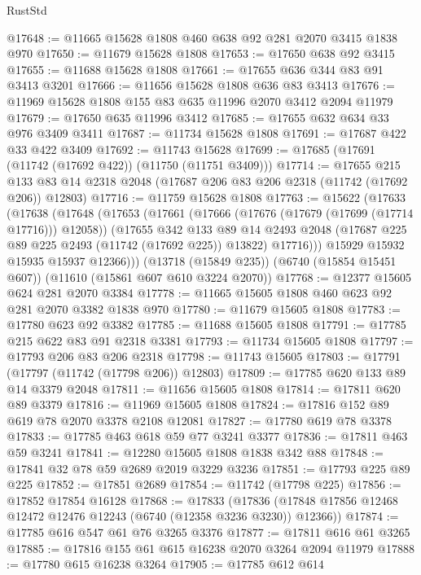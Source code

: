 \begin{lexlean}{RustStd}
\begin{coremodule}
@17648 := @11665 @15628 @1808 @460 @638 @92 @281 @2070 @3415 @1838 @970
@17650 := @11679 @15628 @1808
@17653 := @17650 @638 @92 @3415
@17655 := @11688 @15628 @1808
@17661 := @17655 @636 @344 @83 @91 @3413 @3201
@17666 := @11656 @15628 @1808 @636 @83 @3413
@17676 := @11969 @15628 @1808 @155 @83 @635 @11996 @2070 @3412 @2094 @11979
@17679 := @17650 @635 @11996 @3412
@17685 := @17655 @632 @634 @33 @976 @3409 @3411
@17687 := @11734 @15628 @1808
@17691 := @17687 @422 @33 @422 @3409
@17692 := @11743 @15628
@17699 := @17685 (@17691 (@11742 (@17692 @422)) (@11750 (@11751 @3409)))
@17714 := @17655
    @215
    @133
    @83
    @14
    @2318
    @2048
    (@17687 @206 @83 @206 @2318 (@11742 (@17692 @206)) @12803)
@17716 := @11759 @15628 @1808
@17763 := @15622
    (@17633
      (@17638
        (@17648
          (@17653
            (@17661
              (@17666 (@17676 (@17679 (@17699 (@17714 @17716))) @12058))
              (@17655
                @342
                @133
                @89
                @14
                @2493
                @2048
                (@17687 @225 @89 @225 @2493 (@11742 (@17692 @225)) @13822)
                @17716)))
          @15929
          @15932
          @15935
          @15937
          @12366)))
    (@13718 (@15849 @235))
    (@6740 (@15854 @15451 @607))
    (@11610 (@15861 @607 @610 @3224 @2070))
@17768 := @12377 @15605 @624 @281 @2070 @3384
@17778 := @11665 @15605 @1808 @460 @623 @92 @281 @2070 @3382 @1838 @970
@17780 := @11679 @15605 @1808
@17783 := @17780 @623 @92 @3382
@17785 := @11688 @15605 @1808
@17791 := @17785 @215 @622 @83 @91 @2318 @3381
@17793 := @11734 @15605 @1808
@17797 := @17793 @206 @83 @206 @2318
@17798 := @11743 @15605
@17803 := @17791 (@17797 (@11742 (@17798 @206)) @12803)
@17809 := @17785 @620 @133 @89 @14 @3379 @2048
@17811 := @11656 @15605 @1808
@17814 := @17811 @620 @89 @3379
@17816 := @11969 @15605 @1808
@17824 := @17816 @152 @89 @619 @78 @2070 @3378 @2108 @12081
@17827 := @17780 @619 @78 @3378
@17833 := @17785 @463 @618 @59 @77 @3241 @3377
@17836 := @17811 @463 @59 @3241
@17841 := @12280 @15605 @1808 @1838 @342 @88
@17848 := @17841 @32 @78 @59 @2689 @2019 @3229 @3236
@17851 := @17793 @225 @89 @225
@17852 := @17851 @2689
@17854 := @11742 (@17798 @225)
@17856 := @17852 @17854 @16128
@17868 := @17833
    (@17836 (@17848 @17856 @12468 @12472 @12476 @12243 (@6740 (@12358 @3236 @3230)) @12366))
@17874 := @17785 @616 @547 @61 @76 @3265 @3376
@17877 := @17811 @616 @61 @3265
@17885 := @17816 @155 @61 @615 @16238 @2070 @3264 @2094 @11979
@17888 := @17780 @615 @16238 @3264
@17905 := @17785
    @612
    @614

\end{coremodule}
\end{lexlean}
